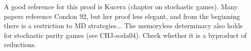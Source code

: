 A good reference for this proof is Kucera (chapter on stochastic
games). Many papers reference Condon 92, but her proof less elegant,
and from the beginning there is a restriction to MD
strategies... The memoryless determinacy also holds for stochastic
parity games (see CHJ-soda04). Check whether it is a byproduct of
reductions.